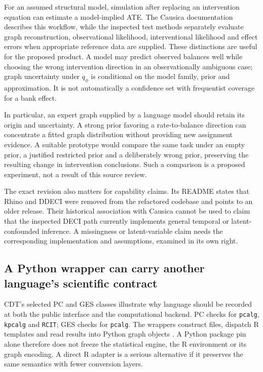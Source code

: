 For an assumed structural model, simulation after replacing an intervention
equation can estimate a model-implied ATE. The Causica documentation describes
this workflow, while the inspected test methods separately evaluate graph
reconstruction, observational likelihood, interventional likelihood and effect
errors when appropriate reference data are supplied. These distinctions are
useful for the proposed product. A model may predict observed balances well
while choosing the wrong intervention direction in an observationally ambiguous
case; graph uncertainty under \(q_\phi\) is conditional on the model family,
prior and approximation. It is not automatically a confidence set with
frequentist coverage for a bank effect.

In particular, an expert graph supplied by a language model should retain its
origin and uncertainty. A strong prior favoring a rate-to-balance direction can
concentrate a fitted graph distribution without providing new assignment
evidence. A suitable prototype would compare the same task under an empty
prior, a justified restricted prior and a deliberately wrong prior, preserving
the resulting change in intervention conclusions. Such a comparison is a
proposed experiment, not a result of this source review.

The exact revision also matters for capability claims. Its README states that
Rhino and DDECI were removed from the refactored codebase and points to an older
release. Their historical association with Causica cannot be used to claim
that the inspected DECI path currently implements general temporal or
latent-confounded inference. A missingness or latent-variable claim needs the
corresponding implementation and assumptions, examined in its own right.

\subsection{A Python wrapper can carry another language's scientific contract}

CDT's selected PC and GES classes illustrate why language should be recorded
at both the public interface and the computational backend. PC checks for
\texttt{pcalg}, \texttt{kpcalg} and \texttt{RCIT}; GES checks for
\texttt{pcalg}. The wrappers construct files, dispatch R templates and read
results into Python graph objects \citep{exec13_pydisc_cdt}. A Python package
pin alone therefore does not freeze the statistical engine, the R environment
or its graph encoding. A direct R adapter is a serious alternative if it
preserves the same semantics with fewer conversion layers.

